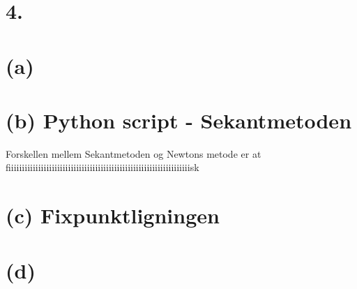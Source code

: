 \section*{4.}
% 
\section*{(a) }

\section*{(b) Python script - Sekantmetoden}

Forskellen mellem Sekantmetoden og Newtons metode er at fiiiiiiiiiiiiiiiiiiiiiiiiiiiiiiiiiiiiiiiiiiiiiiiiiiiiiiiiiiiiiiiiiiisk 

\section*{(c) Fixpunktligningen}


\section*{(d) }